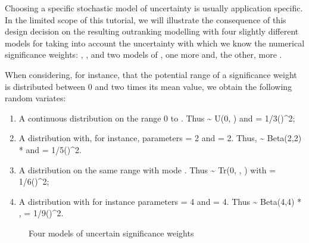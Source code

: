 \documentclass[a4paper,10pt,english]{sphinxhowto}
\let\sphinxpxdimen\pdfpxdimen\else\newdimen\sphinxpxdimen
\begin{document}
Choosing a specific stochastic model of uncertainty is usually application specific. In the limited scope of this tutorial, we will illustrate the consequence of this design decision on the resulting outranking modelling with four slightly different models for taking into account the uncertainty with which we know the numerical significance weights: , , and two models of , one more  and, the other, more .

When considering, for instance, that the potential range of a significance weight is distributed between 0 and two times its mean value, we obtain the following random variates:
\begin{enumerate}
%
\item {} 
A continuous  distribution on the range 0 to . Thus  \textasciitilde{} U(0, ) and  = 1/3()\textasciicircum{}2;

\item {} 
A  distribution with, for instance,
parameters   = 2 and  = 2. Thus,  \textasciitilde{}
Beta(2,2) *  and  = 1/5()\textasciicircum{}2.

\item {} 
A  distribution on the same range with
mode . Thus  \textasciitilde{} Tr(0, , ) with
 = 1/6()\textasciicircum{}2;

\item {} 
A  distribution with for instance
parameters  = 4 and  = 4. Thus  \textasciitilde{} Beta(4,4) *
 ,  = 1/9()\textasciicircum{}2.

\end{enumerate}

\begin{figure}[htbp]
\centering
\capstart

\noindent\sphinxincludegraphics[width=450\sphinxpxdimen]{{weightDistributions}.png}
\caption{Four models of uncertain significance weights}\label{\detokenize{tutorial:weightdistributions}}\end{figure}
\end{document}
